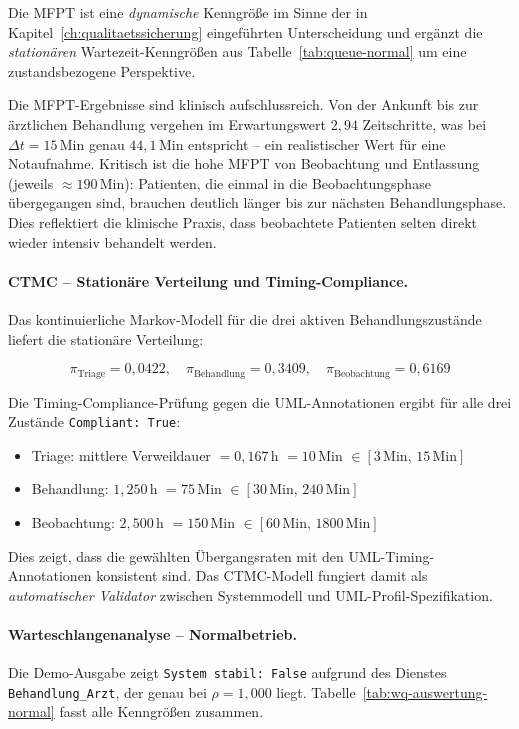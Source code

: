 ﻿\documentclass[a4paper,12pt]{report}
\theoremstyle{definition}
\begin{document}
Die MFPT ist eine \emph{dynamische} Kenngröße im Sinne der in Kapitel~\ref{ch:qualitaetssicherung} eingeführten Unterscheidung und ergänzt die \emph{stationären} Wartezeit-Kenngrößen aus Tabelle~\ref{tab:queue-normal} um eine zustandsbezogene Perspektive.

Die MFPT-Ergebnisse sind klinisch aufschlussreich. Von der Ankunft bis zur
ärztlichen Behandlung vergehen im Erwartungswert $2{,}94$ Zeitschritte,
was bei $\Delta t = 15$\,Min genau $44{,}1$\,Min entspricht -- ein
realistischer Wert für eine Notaufnahme. Kritisch ist die hohe MFPT
von Beobachtung und Entlassung (jeweils $\approx 190$\,Min): Patienten,
die einmal in die Beobachtungsphase übergegangen sind, brauchen
deutlich länger bis zur nächsten Behandlungsphase. Dies reflektiert die
klinische Praxis, dass beobachtete Patienten selten direkt wieder intensiv
behandelt werden.

\paragraph{CTMC -- Stationäre Verteilung und Timing-Compliance.}
Das kontinuierliche Markov-Modell für die drei aktiven Behandlungszustände
liefert die stationäre Verteilung:

\begin{equation}
	\pi_\text{Triage} = 0{,}0422, \quad
	\pi_\text{Behandlung} = 0{,}3409, \quad
	\pi_\text{Beobachtung} = 0{,}6169
\end{equation}

Die Timing-Compliance-Prüfung gegen die UML-Annotationen ergibt
für alle drei Zustände \texttt{Compliant: True}:
\begin{itemize}
	\item[-] Triage: mittlere Verweildauer $= 0{,}167$\,h $= 10$\,Min
	$\in [3\,\text{Min},\, 15\,\text{Min}]$ \checkmark
	\item[-] Behandlung: $1{,}250$\,h $= 75$\,Min
	$\in [30\,\text{Min},\, 240\,\text{Min}]$ \checkmark
	\item[-] Beobachtung: $2{,}500$\,h $= 150$\,Min
	$\in [60\,\text{Min},\, 1800\,\text{Min}]$ \checkmark
\end{itemize}

Dies zeigt, dass die gewählten Übergangsraten mit den UML-Timing-Annotationen
konsistent sind. Das CTMC-Modell fungiert damit als \emph{automatischer
	Validator} zwischen Systemmodell und UML-Profil-Spezifikation.

\paragraph{Warteschlangenanalyse -- Normalbetrieb.}
Die Demo-Ausgabe zeigt \texttt{System \newline stabil: False} aufgrund des
Dienstes \texttt{Behandlung\_Arzt}, der genau bei $\rho = 1{,}000$ liegt.
Tabelle~\ref{tab:wq-auswertung-normal} fasst alle Kenngrößen zusammen.
\end{document}
